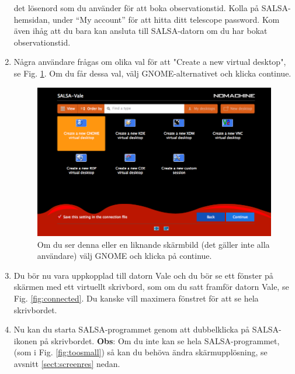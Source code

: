 \begin{enumerate}
det lösenord som du använder för att boka observationstid. Kolla på SALSA-hemsidan, under
``My account'' för att hitta ditt telescope password. Kom även ihåg att du bara kan ansluta
till SALSA-datorn om du har bokat observationstid. 
\item Några användare frågas om olika val för att "Create a new virtual desktop", se 
	Fig. \ref{fig:virtual}. Om du får dessa val, välj GNOME-alternativet och klicka continue.
\begin{figure}[H]
    \centering
    \includegraphics[height=0.5\textwidth]{../figures/nomachinefigs/fig_virtual.png}
	\caption{Om du ser denna eller en liknande skärmbild (det gäller inte alla användare)
		välj GNOME och klicka på continue.
	}
    \label{fig:virtual}
\end{figure}
\item Du bör nu vara uppkopplad till datorn Vale och du bör se ett fönster på skärmen 
	med ett virtuellt skrivbord, som om du satt framför datorn Vale, se Fig. 
	\ref{fig:connected}.  Du kanske vill maximera fönstret för att se hela skrivbordet.
\item Nu kan du starta SALSA-programmet genom att dubbelklicka på SALSA-ikonen på
	skrivbordet. {\bf Obs}: Om du inte kan se hela SALSA-programmet, 
	(som i Fig. \ref{fig:toosmall}) så kan du behöva ändra skärmupplösning,
	se avsnitt 	\ref{sect:screenres} nedan.
\end{enumerate}

